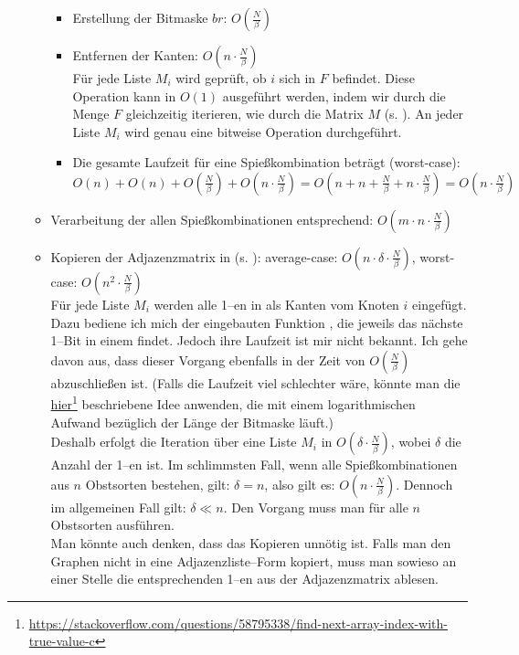 \begin{itemize}
\begin{itemize}
\begin{itemize}
      \item Erstellung der Bitmaske $br$: $O(\frac{N}{\beta})$

      \item Entfernen der Kanten: $O(n \cdot \frac{N}{\beta})$\\
      Für jede Liste $M_i$ wird geprüft, ob $i$ sich in $F$ befindet.
      Diese Operation kann in $O(1)$ ausgeführt werden, indem wir durch
      die Menge $F$ gleichzeitig iterieren, wie durch die Matrix $M$ (s. ).
      An jeder Liste $M_i$ wird genau eine bitweise Operation durchgeführt.

      \item Die gesamte Laufzeit für eine Spießkombination beträgt (worst-case):\\
      $O(n) + O(n) + O(\frac{N}{\beta}) + O(n \cdot\frac{N}{\beta}) 
      = O(n + n + \frac{N}{\beta} + n \cdot\frac{N}{\beta}) = O(n \cdot\frac{N}{\beta})$
    \end{itemize}

    \item Verarbeitung der allen Spießkombinationen entsprechend: $O(m \cdot n \cdot\frac{N}{\beta})$

    \item Kopieren der Adjazenzmatrix in  (s. ): average-case: $O(n \cdot \delta \cdot \frac{N}{\beta})$, worst-case: $O(n^2 \cdot \frac{N}{\beta})$ \\
    Für jede Liste $M_i$ werden alle 1--en in  als Kanten vom Knoten $i$ eingefügt.
    Dazu bediene ich mich der eingebauten Funktion ,
    die jeweils das nächste 1--Bit in einem  findet.
    Jedoch ihre Laufzeit ist mir nicht bekannt.
    Ich gehe davon aus, dass dieser Vorgang ebenfalls in der Zeit von $O(\frac{N}{\beta})$ abzuschließen ist. 
    (Falls die Laufzeit viel schlechter wäre, könnte man die \href{https://stackoverflow.com/questions/58795338/find-next-array-index-with-true-value-c}{hier}\footnote{\href{https://stackoverflow.com/questions/58795338/find-next-array-index-with-true-value-c}{https://stackoverflow.com/questions/58795338/find-next-array-index-with-true-value-c}} beschriebene Idee anwenden,
    die mit einem logarithmischen Aufwand bezüglich der Länge der Bitmaske läuft.)\\
    Deshalb erfolgt die Iteration über eine Liste $M_i$ in $O(\delta \cdot \frac{N}{\beta})$, wobei
    $\delta$ die Anzahl der 1--en ist. Im schlimmsten Fall, wenn alle Spießkombinationen aus
    $n$ Obstsorten bestehen, gilt: $\delta = n$, also gilt es: $O(n \cdot \frac{N}{\beta})$.
    Dennoch im allgemeinen Fall gilt: $\delta \ll n$. Den Vorgang muss man für alle $n$ Obstsorten
    ausführen.\\
    Man könnte auch denken, dass das Kopieren unnötig ist. Falls man den Graphen nicht
    in eine Adjazenzliste--Form kopiert,
    muss man sowieso an einer Stelle die entsprechenden 1--en aus der Adjazenzmatrix ablesen.


\end{itemize}
\end{itemize}
